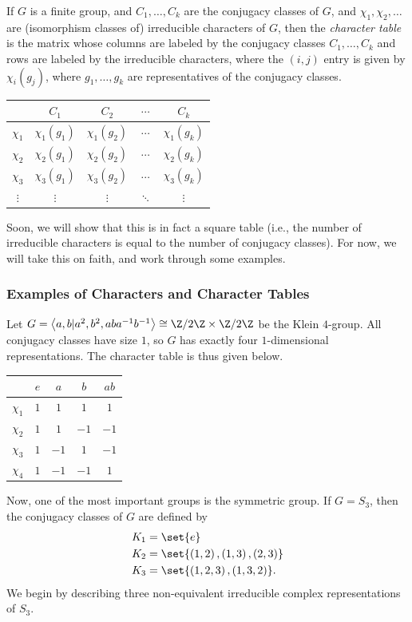 \documentclass[10pt]{mypackage}
\begin{document}
If $G$ is a finite group, and $C_1,\dots,C_k$ are the conjugacy classes of $G$, and $\chi_1,\chi_2,\dots$ are (isomorphism classes of) irreducible characters of $G$, then the \textit{character table} is the matrix whose columns are labeled by the conjugacy classes $C_1,\dots,C_k$ and rows are labeled by the irreducible characters, where the $\left( i,j \right)$ entry is given by $\chi_i\left( g_j \right)$, where $g_1,\dots,g_k$ are representatives of the conjugacy classes.
\begin{center}
  \begin{tabular}{c|c|c|c|c}
    & $C_1$ & $C_2$ & $\cdots$ & $C_k$\\
    \hline
    $\chi_1$ & $\chi_1\left( g_1 \right)$ & $\chi_1\left( g_2 \right)$ & $\cdots$ & $\chi_1\left( g_k \right)$\\
    $\chi_2$ & $\chi_2\left( g_1 \right)$ & $\chi_2\left( g_2 \right)$ & $\cdots$ & $\chi_2\left( g_k \right)$\\
    $\chi_3$ & $\chi_3\left( g_1 \right)$ & $\chi_3\left( g_2 \right)$ & $\cdots$ & $\chi_3\left( g_k \right)$\\
    $\vdots$ & $\vdots$ & $\vdots$ & $\ddots$ & $\vdots$
  \end{tabular}
\end{center}
Soon, we will show that this is in fact a square table (i.e., the number of irreducible characters is equal to the number of conjugacy classes). For now, we will take this on faith, and work through some examples.
\subsubsection{Examples of Characters and Character Tables}%
Let $G = \left\langle a,b|a^2,b^2,aba^{-1}b^{-1} \right\rangle\cong \Z/2\Z\times\Z/2\Z$ be the Klein $4$-group. All conjugacy classes have size $1$, so $G$ has exactly four $1$-dimensional representations. The character table is thus given below.
\begin{center}
  \begin{tabular}{c|c|c|c|c}
    & $e$ & $a$ & $b$ & $ab$\\
    \hline
    $\chi_1$ & $1$ & $1$ & $1$ & $1$\\
    $\chi_2$ & $1$ & $1$ & $-1$ & $-1$\\
    $\chi_3$ & $1$ & $-1$ & $1$ & $-1$\\
    $\chi_4$ & $1$ & $-1$ & $-1$ & $1$
  \end{tabular}
\end{center}
Now, one of the most important groups is the symmetric group. If $G = S_3$, then the conjugacy classes of $G$ are defined by
\begin{align*}
  K_1 &= \set{e}\\
  K_2 &= \set{\left( 1,2 \right),\left( 1,3 \right),\left( 2,3 \right)}\\
  K_3 &= \set{\left( 1,2,3 \right),\left( 1,3,2 \right)}.
\end{align*}
We begin by describing three non-equivalent irreducible complex representations of $S_3$.
\end{document}
